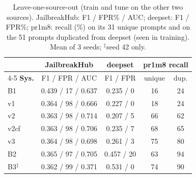 \begin{table}[t]
\centering
\caption{Leave-one-source-out (train and tune on the other two sources). JailbreakHub: F1 / FPR\% / AUC; deepset: F1 / FPR\%; pr1m8: recall (\%) on its 31 unique prompts and on the 51 prompts duplicated from deepset (seen in training). Mean of 3 seeds; $^\ddagger$seed 42 only.}
\label{tab:loso}
\small
\setlength{\tabcolsep}{2.5pt}
\begin{tabular}{lcccc}
\toprule
 & \textbf{JailbreakHub} & \textbf{deepset} & \multicolumn{2}{c}{\textbf{pr1m8 recall}} \\
\cmidrule(lr){4-5}
\textbf{Sys.} & F1 / FPR / AUC & F1 / FPR & unique & dup. \\
\midrule
B1 & 0.439 / 17 / 0.637 & 0.235 / 0 & 16 & 24 \\
v1 & 0.364 / 98 / 0.666 & 0.227 / 0 & 18 & 24 \\
v2 & 0.363 / 98 / 0.714 & 0.207 / 5 & 66 & 62 \\
v2cf & 0.363 / 98 / 0.706 & 0.235 / 7 & 68 & 65 \\
v3 & 0.364 / 98 / 0.698 & 0.261 / 3 & 75 & 80 \\
B2 & 0.365 / 97 / 0.705 & 0.457 / 20 & 63 & 94 \\
B3$^\ddagger$ & 0.362 / 99 / 0.371 & 0.531 / 0 & 74 & 90 \\
\bottomrule
\end{tabular}
\end{table}
